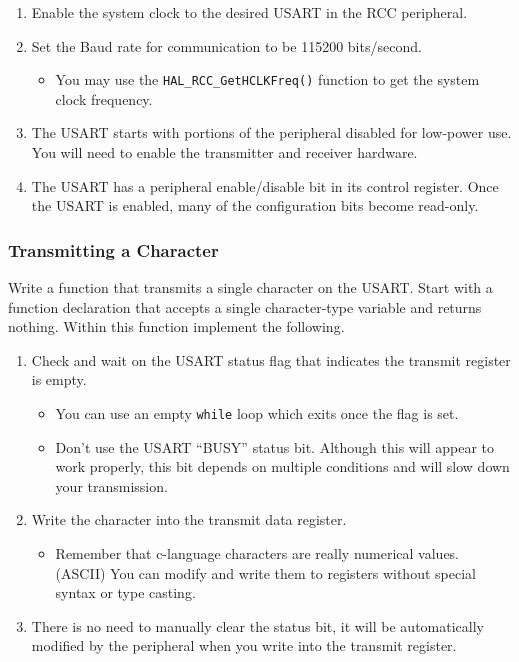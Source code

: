 \documentclass[openany,11pt,fleqn]{book} %
\begin{document}
\begin{enumerate}
 \item Enable the system clock to the desired USART in the RCC peripheral.
 \item Set the Baud rate for communication to be 115200 bits/second. 
 \begin{itemize}
     \item You may use the \texttt{HAL\_RCC\_GetHCLKFreq()} function to get the system clock frequency. 
 \end{itemize}
 \item The USART starts with portions of the peripheral disabled for low-power use. You will need to enable the transmitter and receiver hardware.
 \item The USART has a peripheral enable/disable bit in its control register. Once the USART is enabled, many of the configuration bits become read-only.  
\end{enumerate}

\subsubsection{Transmitting a Character}

Write a function that transmits a single character on the USART. Start with a function declaration that accepts a single character-type variable and returns nothing. Within this function implement the following.

\begin{enumerate}
 \item Check and wait on the USART status flag that indicates the transmit register is empty.
 \begin{itemize}
     \item You can use an empty \texttt{while} loop which exits once the flag is set. 
     \item Don't use the USART ``BUSY'' status bit. Although this will appear to work properly, this bit depends on multiple conditions and will slow down your transmission. 
 \end{itemize}
 \item Write the character into the transmit data register. 
 \begin{itemize}
     \item Remember that c-language characters are really numerical values. (ASCII) You can modify and write them to registers without special syntax or type casting.  
 \end{itemize}
 \item There is no need to manually clear the status bit, it will be automatically modified by the peripheral when you write into the transmit register.
\end{enumerate}
\end{document}
